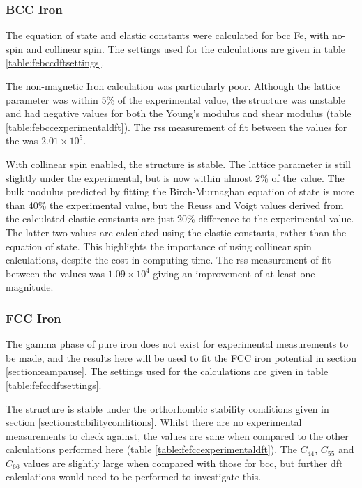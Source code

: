 \FloatBarrier
\subsubsection{BCC Iron}

The equation of state and elastic constants were calculated for \acrshort{bcc} Fe, with no-spin and collinear spin.  The settings used for the calculations are given in table \ref{table:febccdftsettings}. 


The non-magnetic Iron calculation was particularly poor.  Although the lattice parameter was within 5\% of the experimental value, the structure was unstable and had negative values for both the Young's modulus and shear modulus (table \ref{table:febccexperimentaldft}).  The \acrshort{rss} measurement of fit between the values for the was $2.01 \times 10^5$.

With collinear spin enabled, the structure is stable.  The lattice parameter is still slightly under the experimental, but is now within almost 2\% of the value.  The bulk modulus predicted by fitting the Birch-Murnaghan equation of state is more than 40\% the experimental value, but the Reuss and Voigt values derived from the calculated elastic constants are just 20\% difference to the experimental value.  The latter two values are calculated using the elastic constants, rather than the equation of state.  This highlights the importance of using collinear spin calculations, despite the cost in computing time.  The \acrshort{rss} measurement of fit between the values was $1.09 \times 10^4$ giving an improvement of at least one magnitude.




\FloatBarrier
\subsubsection{FCC Iron}
\label{section:fccferesults}

The gamma phase of pure iron does not exist for experimental measurements to be made, and the results here will be used to fit the FCC iron potential in section \ref{section:eampause}.  The settings used for the calculations are given in table \ref{table:fefccdftsettings}. 

The structure is stable under the orthorhombic stability conditions given in section \ref{section:stabilityconditions}.  Whilst there are no experimental measurements to check against, the values are sane when compared to the other calculations performed here (table \ref{table:fefccexperimentaldft}).  The $C_{44}$, $C_{55}$ and $C_{66}$ values are slightly large when compared with those for \acrshort{bcc}, but further \acrshort{dft} calculations would need to be performed to investigate this.  

